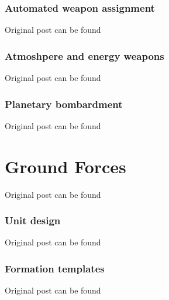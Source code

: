 \documentclass[10pt,a4paper,oneside]{article}
\begin{document}
\section{Automated weapon assignment}
Original post can be found

\section{Atmoshpere and energy weapons}
Original post can be found

\section{Planetary bombardment}
Original post can be found


\newpage
\part{Ground Forces}
Original post can be found

\section{Unit design}
Original post can be found

\section{Formation templates}
Original post can be found

\end{document}
